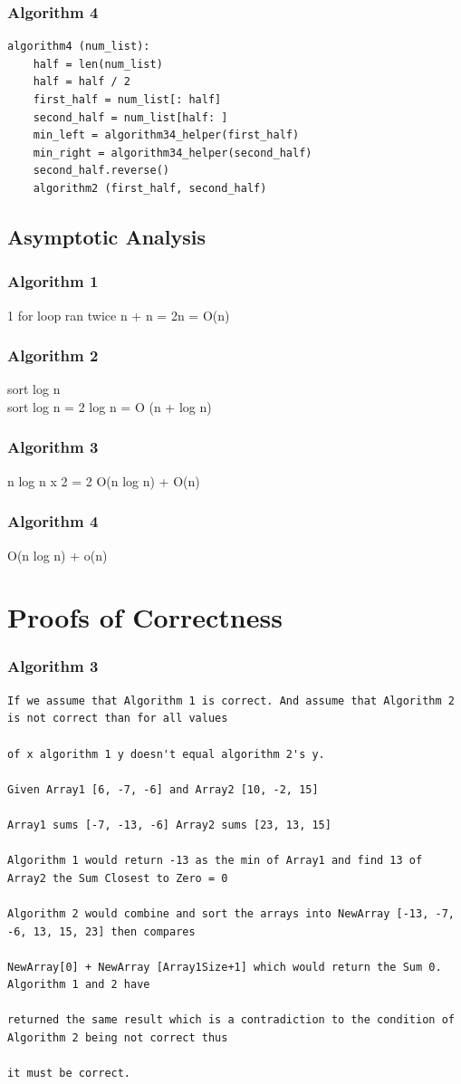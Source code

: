 \documentclass[letterpaper,10pt,titlepage]{article}
\begin{document}
\subsubsection{Algorithm 4}
\begin{verbatim}
algorithm4 (num_list):
    half = len(num_list)
    half = half / 2
    first_half = num_list[: half]
    second_half = num_list[half: ]
    min_left = algorithm34_helper(first_half)
    min_right = algorithm34_helper(second_half)
    second_half.reverse()
    algorithm2 (first_half, second_half)
\end{verbatim}

\subsection{Asymptotic Analysis}
\subsubsection{Algorithm 1}
1 for loop ran twice n + n = 2n = O(n)
\subsubsection{Algorithm 2}
sort log n \\
sort log n = 2 log n = O (n + log n)
\subsubsection{Algorithm 3}
n log n x 2 = 2 O(n log n) + O(n)
\subsubsection{Algorithm 4}
O(n log n) + o(n)

\section{Proofs of Correctness}
\subsubsection{Algorithm 3}
\begin{verbatim}
If we assume that Algorithm 1 is correct. And assume that Algorithm 2 is not correct than for all values 

of x algorithm 1 y doesn't equal algorithm 2's y. 

Given Array1 [6, -7, -6] and Array2 [10, -2, 15]

Array1 sums [-7, -13, -6] Array2 sums [23, 13, 15]

Algorithm 1 would return -13 as the min of Array1 and find 13 of Array2 the Sum Closest to Zero = 0

Algorithm 2 would combine and sort the arrays into NewArray [-13, -7, -6, 13, 15, 23] then compares 

NewArray[0] + NewArray [Array1Size+1] which would return the Sum 0. Algorithm 1 and 2 have 

returned the same result which is a contradiction to the condition of Algorithm 2 being not correct thus 

it must be correct.
\end{verbatim}
\end{document}
